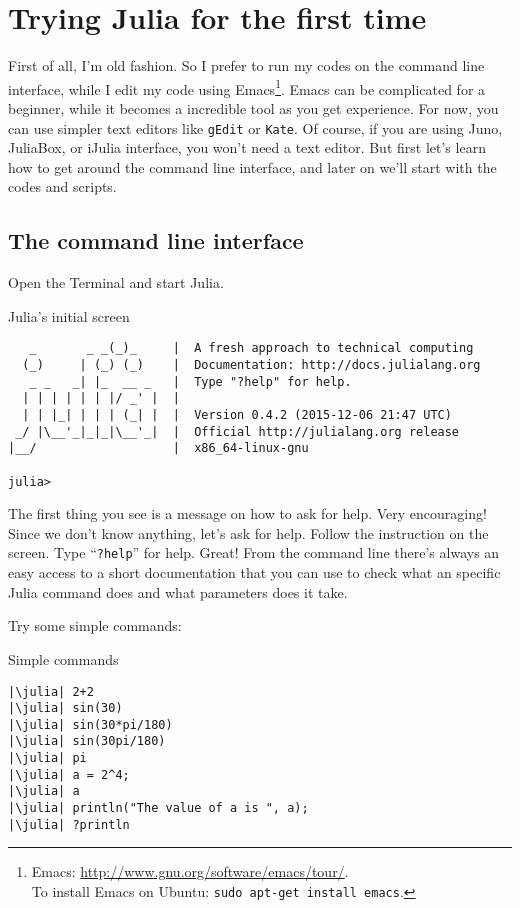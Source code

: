 \section{Trying Julia for the first time}

First of all, I'm old fashion. So I prefer to run my codes on the command line interface, while I edit my code using Emacs\footnote{Emacs: \url{http://www.gnu.org/software/emacs/tour/}.\\To install Emacs on Ubuntu: \texttt{sudo apt-get install emacs}.}. Emacs can be complicated for a beginner, while it becomes a incredible tool as you get experience. For now, you can use simpler text editors like \texttt{gEdit} or \texttt{Kate}. Of course, if you are using Juno, JuliaBox, or iJulia interface, you won't need a text editor. But first let's learn how to get around the command line interface, and later on we'll start with the codes and scripts.

\subsection{The command line interface}

Open the Terminal and start Julia.

\begin{example}{Julia's initial screen}
\begin{verbatim}
   _       _ _(_)_     |  A fresh approach to technical computing
  (_)     | (_) (_)    |  Documentation: http://docs.julialang.org
   _ _   _| |_  __ _   |  Type "?help" for help.
  | | | | | | |/ _' |  |
  | | |_| | | | (_| |  |  Version 0.4.2 (2015-12-06 21:47 UTC)
 _/ |\__'_|_|_|\__'_|  |  Official http://julialang.org release
|__/                   |  x86_64-linux-gnu

julia> 
\end{verbatim}
\end{example}

The first thing you see is a message on how to ask for help. Very encouraging! Since we don't know anything, let's ask for help. Follow the instruction on the screen. Type ``\texttt{?help}'' for help. Great! From the command line there's always an easy access to a short documentation that you can use to check what an specific Julia command does and what parameters does it take. 

Try some simple commands:

\begin{example}{Simple commands}
\begin{verbatim}
|\julia| 2+2
|\julia| sin(30)
|\julia| sin(30*pi/180)
|\julia| sin(30pi/180)
|\julia| pi
|\julia| a = 2^4;
|\julia| a
|\julia| println("The value of a is ", a);
|\julia| ?println
\end{verbatim}
\end{example}

